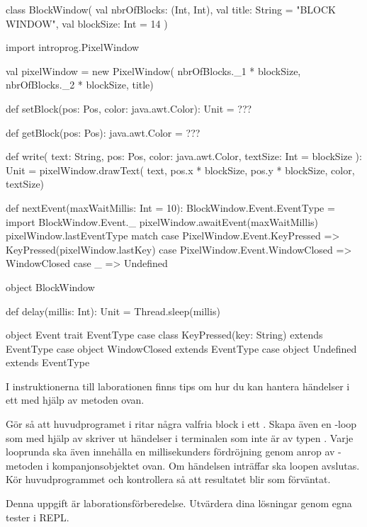 \begin{CodeSmall}
class BlockWindow(
  val nbrOfBlocks: (Int, Int),
  val title: String = "BLOCK WINDOW",
  val blockSize: Int = 14
) {
  import introprog.PixelWindow

  val pixelWindow = new PixelWindow(
    nbrOfBlocks._1 * blockSize, nbrOfBlocks._2 * blockSize, title)

  def setBlock(pos: Pos, color: java.awt.Color): Unit = ???

  def getBlock(pos: Pos): java.awt.Color = ???

  def write(
    text: String,
    pos: Pos,
    color: java.awt.Color,
    textSize: Int = blockSize
  ): Unit = pixelWindow.drawText(
      text, pos.x * blockSize, pos.y * blockSize, color, textSize)

  def nextEvent(maxWaitMillis: Int = 10): BlockWindow.Event.EventType  = {
    import BlockWindow.Event._
    pixelWindow.awaitEvent(maxWaitMillis)
    pixelWindow.lastEventType match {
      case PixelWindow.Event.KeyPressed   => KeyPressed(pixelWindow.lastKey)
      case PixelWindow.Event.WindowClosed => WindowClosed
      case _                              => Undefined
    }
  }
}

object BlockWindow {
  def delay(millis: Int): Unit = Thread.sleep(millis)

  object Event {
    trait EventType
    case class  KeyPressed(key: String) extends EventType
    case object WindowClosed            extends EventType
    case object Undefined               extends EventType
  }
}
\end{CodeSmall}
I instruktionerna till laborationen \texttt{\LabWeekFIVE} finns tips om hur du kan hantera händelser i ett  med hjälp av metoden  ovan.

\Subtask Gör så att huvudprogramet i  ritar några valfria block i ett . Skapa även en -loop som med hjälp av  skriver ut händelser i terminalen som inte är av typen . Varje looprunda ska även innehålla en  millisekunders fördröjning genom anrop av -metoden i kompanjonsobjektet ovan. Om händelsen  inträffar ska loopen avslutas. Kör huvudprogrammet och kontrollera så att resultatet blir som förväntat.

\SOLUTION


\TaskSolved \what Denna uppgift är laborationsförberedelse. Utvärdera dina lösningar genom egna tester i REPL.

